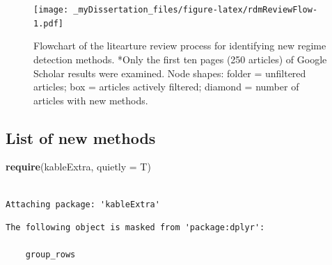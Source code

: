 \documentclass[12pt,twoside,openany]{reedthesis}
\newenvironment{Shaded}{\begin{snugshade}}{\end{snugshade}}
\newcommand{\KeywordTok}[1]{\textcolor[rgb]{0.13,0.29,0.53}{\textbf{#1}}}
\newcommand{\DataTypeTok}[1]{\textcolor[rgb]{0.13,0.29,0.53}{#1}}
\newcommand{\StringTok}[1]{\textcolor[rgb]{0.31,0.60,0.02}{#1}}
\newcommand{\CommentTok}[1]{\textcolor[rgb]{0.56,0.35,0.01}{\textit{#1}}}
\newcommand{\OperatorTok}[1]{\textcolor[rgb]{0.81,0.36,0.00}{\textbf{#1}}}
\newcommand{\NormalTok}[1]{#1}
\begin{document}
\begin{figure}
\centering
\texttt{[image: \_myDissertation\_files/figure-latex/rdmReviewFlow-1.pdf]}
\caption{\label{fig:rdmReviewFlow}Flowchart of the litearture review process
for identifying new regime detection methods. *Only the first ten pages
(250 articles) of Google Scholar results were examined. Node shapes:
folder = unfiltered articles; box = articles actively filtered; diamond
= number of articles with new methods.}
\end{figure}
\subsection{List of new methods}\label{list-of-new-methods}
\begin{Shaded}
\begin{Highlighting}[]
\KeywordTok{require}\NormalTok{(kableExtra, }\DataTypeTok{quietly =}\NormalTok{ T)}
\end{Highlighting}
\end{Shaded}
\begin{verbatim}

Attaching package: 'kableExtra'
\end{verbatim}
\begin{verbatim}
The following object is masked from 'package:dplyr':

    group_rows
\end{verbatim}
\begin{Shaded}
\end{Shaded}
\end{document}
